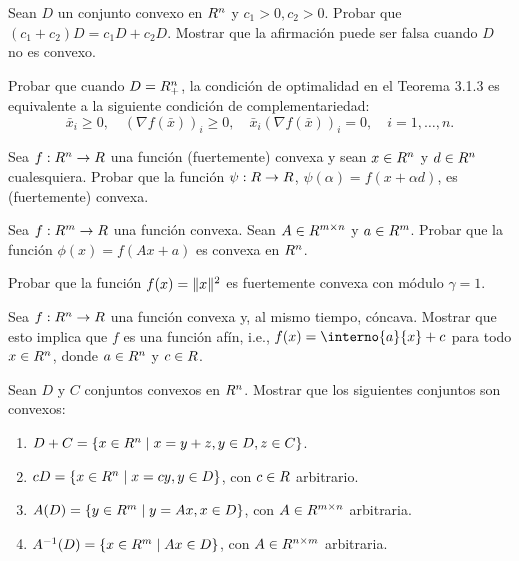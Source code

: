 \begin{exercise}\label{v1:ejer:3.1.6}
 Sean $D$ un conjunto convexo en $R^n$ y $c_1 > 0, c_2 > 0$. Probar que $(c_1 + c_2)D = c_1 D + c_2 D$.
 Mostrar que la afirmación puede ser falsa cuando $D$ no es convexo.
\end{exercise}

\begin{exercise}\label{v1:ejer:3.1.7}
 Probar que cuando $D = R_+^n$, la condición de optimalidad en el Teorema 3.1.3 es equivalente a la siguiente condición de complementariedad:
 \[
 \bar{x}_i \ge 0, \quad (\nabla f(\bar{x}))_i \ge 0, \quad \bar{x}_i (\nabla f(\bar{x}))_i = 0, \quad i = 1, \dots, n.
 \]
\end{exercise}

\begin{exercise}\label{v1:ejer:3.1.8}
 Sea $f : R^n \to R$ una función (fuertemente) convexa y sean $x \in R^n$ y $d \in R^n$ cualesquiera. Probar que la función $\psi : R \to R$, $\psi(\alpha) = f(x + \alpha d)$, es (fuertemente) convexa.
\end{exercise}

\begin{exercise}\label{v1:ejer:3.1.9}
 Sea $f : R^m \to R$ una función convexa. Sean $A \in R^{m \times n}$ y $a \in R^m$. Probar que la función $\phi(x) = f(Ax + a)$ es convexa en $R^n$.
\end{exercise}

\begin{exercise}\label{v1:ejer:3.1.10}
 Probar que la función $f(x) = \lVert x\rVert^2$ es fuertemente convexa con módulo $\gamma = 1$.
\end{exercise}

\begin{exercise}\label{v1:ejer:3.1.11}
 Sea $f : R^n \to R$ una función convexa y, al mismo tiempo, cóncava. Mostrar que esto implica que $f$ es una función afín, i.e., $f(x) = \interno{a}{x} + c$ para todo $x \in R^n$, donde $a \in R^n$ y $c \in R$.
\end{exercise}


\begin{exercise}\label{v1:ejer:3.2.1}
 Sean $D$ y $C$ conjuntos convexos en $R^n$. Mostrar que los siguientes conjuntos son convexos:
 \begin{enumerate}[label=(\alph*)]
  \item $D + C = \{ x \in R^n \mid x = y + z, y \in D, z \in C \}$.
  \item $cD = \{ x \in R^n \mid x = cy, y \in D \}$, con $c \in R$ arbitrario.
  \item $A(D) = \{ y \in R^m \mid y = Ax, x \in D \}$, con $A \in R^{m \times n}$ arbitraria.
  \item $A^{-1}(D) = \{ x \in R^m \mid Ax \in D \}$, con $A \in R^{n \times m}$ arbitraria.
 \end{enumerate}
\end{exercise}

